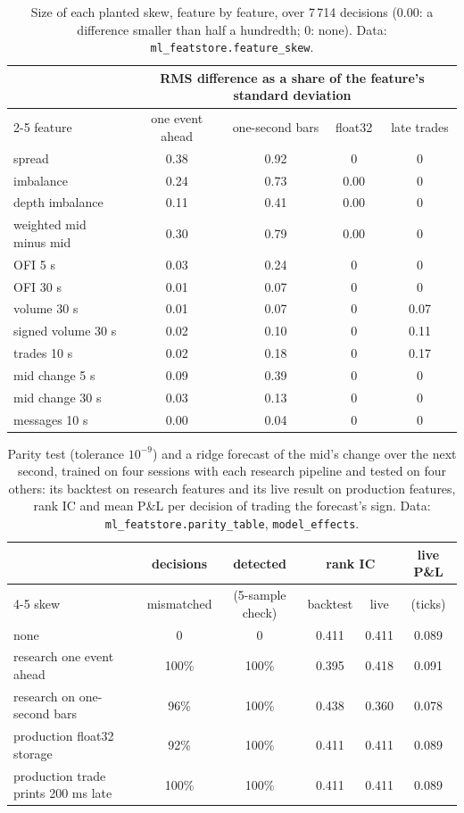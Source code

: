 \begin{table}[htbp]
\centering\small
\begin{tabular}{@{}lcccc@{}}
\toprule
& \multicolumn{4}{c}{RMS difference as a share of the feature's standard deviation}\\
\cmidrule(l){2-5}
feature & one event ahead & one-second bars & float32 & late trades\\
\midrule
spread & 0.38 & 0.92 & 0 & 0\\
imbalance & 0.24 & 0.73 & 0.00 & 0\\
depth imbalance & 0.11 & 0.41 & 0.00 & 0\\
weighted mid minus mid & 0.30 & 0.79 & 0.00 & 0\\
OFI 5 s & 0.03 & 0.24 & 0 & 0\\
OFI 30 s & 0.01 & 0.07 & 0 & 0\\
volume 30 s & 0.01 & 0.07 & 0 & 0.07\\
signed volume 30 s & 0.02 & 0.10 & 0 & 0.11\\
trades 10 s & 0.02 & 0.18 & 0 & 0.17\\
mid change 5 s & 0.09 & 0.39 & 0 & 0\\
mid change 30 s & 0.03 & 0.13 & 0 & 0\\
messages 10 s & 0.00 & 0.04 & 0 & 0\\
\bottomrule
\end{tabular}
\caption{Size of each planted skew, feature by feature, over 7\,714 decisions (0.00: a difference smaller than half a
hundredth; 0: none). Data: \texttt{ml\_featstore.feature\_skew}.}\label{tab:ml:fs:skew}
\end{table}

\begin{table}[htbp]
\centering\small
\begin{tabular}{@{}lccccc@{}}
\toprule
& decisions & detected & \multicolumn{2}{c}{rank IC} & live P\&L\\
\cmidrule(lr){4-5}
skew & mismatched & (5-sample check) & backtest & live & (ticks)\\
\midrule
none & 0 & 0 & 0.411 & 0.411 & 0.089\\
research one event ahead & 100\% & 100\% & 0.395 & 0.418 & 0.091\\
research on one-second bars & 96\% & 100\% & 0.438 & 0.360 & 0.078\\
production float32 storage & 92\% & 100\% & 0.411 & 0.411 & 0.089\\
production trade prints 200 ms late & 100\% & 100\% & 0.411 & 0.411 & 0.089\\
\bottomrule
\end{tabular}
\caption{Parity test (tolerance $10^{-9}$) and a ridge forecast of the mid's change over the next second, trained on four
sessions with each research pipeline and tested on four others: its backtest on research features and its live result on
production features, rank IC and mean P\&L per decision of trading the forecast's sign. Data:
\texttt{ml\_featstore.parity\_table}, \texttt{model\_effects}.}\label{tab:ml:fs:parity}
\end{table}

